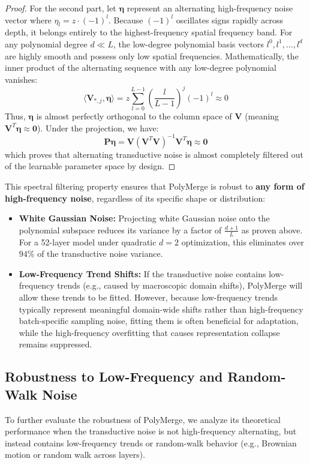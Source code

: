 \begin{proof}
For the second part, let $\boldsymbol{\eta}$ represent an alternating high-frequency noise vector where $\eta_l = z \cdot (-1)^l$. Because $(-1)^l$ oscillates signs rapidly across depth, it belongs entirely to the highest-frequency spatial frequency band. For any polynomial degree $d \ll L$, the low-degree polynomial basis vectors $l^0, l^1, \dots, l^d$ are highly smooth and possess only low spatial frequencies. Mathematically, the inner product of the alternating sequence with any low-degree polynomial vanishes:
\begin{equation}
\langle \mathbf{V}_{*, j}, \boldsymbol{\eta} \rangle = z \sum_{l=0}^{L-1} \left(\frac{l}{L-1}\right)^j (-1)^l \approx 0
\end{equation}
Thus, $\boldsymbol{\eta}$ is almost perfectly orthogonal to the column space of $\mathbf{V}$ (meaning $\mathbf{V}^T \boldsymbol{\eta} \approx \mathbf{0}$). Under the projection, we have:
\begin{equation}
\mathbf{P}\boldsymbol{\eta} = \mathbf{V}(\mathbf{V}^T\mathbf{V})^{-1}\mathbf{V}^T\boldsymbol{\eta} \approx \mathbf{0}
\end{equation}
which proves that alternating transductive noise is almost completely filtered out of the learnable parameter space by design.
\end{proof}

This spectral filtering property ensures that PolyMerge is robust to \textbf{any form of high-frequency noise}, regardless of its specific shape or distribution:
\begin{itemize}
    \item \textbf{White Gaussian Noise:} Projecting white Gaussian noise onto the polynomial subspace reduces its variance by a factor of $\frac{d+1}{L}$ as proven above. For a 52-layer model under quadratic $d=2$ optimization, this eliminates over $94\%$ of the transductive noise variance.
    \item \textbf{Low-Frequency Trend Shifts:} If the transductive noise contains low-frequency trends (e.g., caused by macroscopic domain shifts), PolyMerge will allow these trends to be fitted. However, because low-frequency trends typically represent meaningful domain-wide shifts rather than high-frequency batch-specific sampling noise, fitting them is often beneficial for adaptation, while the high-frequency overfitting that causes representation collapse remains suppressed.
\end{itemize}

\subsection{Robustness to Low-Frequency and Random-Walk Noise}
To further evaluate the robustness of PolyMerge, we analyze its theoretical performance when the transductive noise is not high-frequency alternating, but instead contains low-frequency trends or random-walk behavior (e.g., Brownian motion or random walk across layers).

